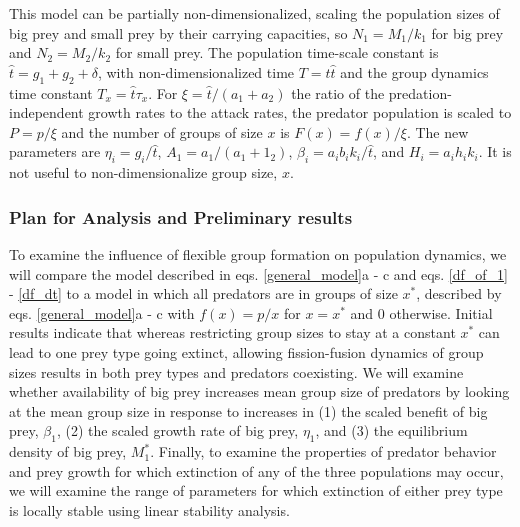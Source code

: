 This model can be partially non-dimensionalized, scaling the population sizes of big prey and small prey by their carrying capacities, so $N_1 = M_1/k_1$ for big prey and $N_2 = M_2/k_2$ for small prey. The population time-scale constant is $\hat{t} = g_1 + g_2 + \delta$, with non-dimensionalized time $T = t \hat{t}$ and the group dynamics time constant $T_x = \hat{t} \tau_x$. For $\xi = \hat{t}/(a_1 + a_2)$ the ratio of the predation-independent growth rates to the attack rates, the predator population is scaled to $P = p/\xi$ and the number of groups of size $x$ is $F(x) = f(x) /\xi$. The new parameters are $\eta_i = g_i/\hat{t}$, $A_1 = a_1/(a_1 + 1_2)$, $\beta_i = a_i b_i k_i/\hat{t}$, and $H_i = a_i h_i k_i$. It is not useful to non-dimensionalize group size, $x$.

\subsubsection{Plan for Analysis and Preliminary results}
To examine the influence of flexible group formation on population dynamics, we will compare the model described in eqs. \ref{general_model}a - c and eqs. \ref{df_of_1} - \ref{df_dt} to a model in which all predators are in groups of size $x^*$, described by eqs. \ref{general_model}a - c with $f(x) = p/x$ for $x = x^*$ and 0 otherwise. Initial results indicate that whereas restricting group sizes to stay at a constant $x^*$ can lead to one prey type going extinct, allowing fission-fusion dynamics of group sizes results in both prey types and predators coexisting. We will examine whether availability of big prey increases mean group size of predators by looking at the mean group size in response to increases in (1) the scaled benefit of big prey, $\beta_1$, (2) the scaled growth rate of big prey, $\eta_1$, and (3) the equilibrium density of big prey, $M_1^*$. Finally, to examine the properties of predator behavior and prey growth for which extinction of any of the three populations may occur, we will examine the range of parameters for which extinction of either prey type is locally stable using linear stability analysis. %



